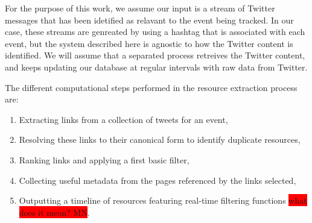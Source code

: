 \documentclass{sig-alternate}
\newcommand{\todo}[1]{\colorbox{red}{#1}}
\begin{document}
For the purpose of this work, we assume our input is a stream of Twitter messages that has been idetified as relavant to the event being tracked. In our case, these streams are genreated by using a hashtag that is associated with each event, but the system described here is agnostic to how the Twitter content is identified. We will assume that a separated process retreives the Twitter content, and keeps updating our database at regular intervals with raw data from Twitter. 


The different computational steps performed in the resource extraction process are:
\begin{enumerate}
 \item Extracting links from a collection of tweets for an event,
 \item Resolving these links to their canonical form to identify duplicate resources,
 \item Ranking links and applying a first basic filter,
 \item Collecting useful metadata from the pages referenced by the links selected,
 \item Outputting a timeline of resources featuring real-time filtering functions \todo{what does it mean? MN}.
\end{enumerate}
\end{document}
